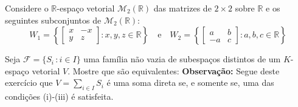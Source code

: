 \documentclass[11pt,a4paper]{article}
\begin{document}
\begin{exercicio} Considere o $\mathbb{R}$-espaço vetorial $\mathcal{M}_2(\mathbb{R})$ das matrizes de $2 \times 2$ sobre $\mathbb{R}$ e os seguintes subconjuntos de $\mathcal{M}_2(\mathbb{R}):$
\[
W_1 = \left\{ \begin{bmatrix} x & -x \\ y & z \end{bmatrix} : x,y,z \in \mathbb{R} \right\} \quad \mbox{e} \quad W_2 = \left\{ \begin{bmatrix} a & b \\ -a & c \end{bmatrix} : a,b,c \in \mathbb{R} \right\}
\]
\end{exercicio}
\begin{exercicio} Seja \(\mathcal{F}=\{S_i\,\colon i \in I\}\) uma
família não vazia de subespaços distintos de um \(K\)-espaço vetorial \(V\).
Mostre que são equivalentes:
\textbf{Observação:} Segue deste exercício que \(V=\sum\limits_{i\in I}S_i\) é uma
soma direta se, e somente se, uma das condições (i)-(iii) é satisfeita.
\end{exercicio}
\end{document}
